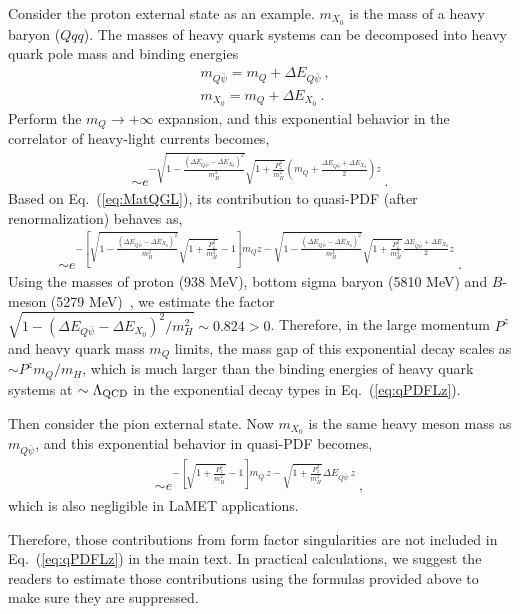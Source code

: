 \documentclass[a4paper,11pt]{article}
\begin{document}
Consider the proton external state as an example. $m_{X_0}$ is the mass of a heavy baryon ($Qqq$). The masses of heavy quark systems can be decomposed into heavy quark pole mass and binding energies
\begin{align}
&m_{Q \bar{\psi}} = m_{Q} + \Delta E_{Q\bar{\psi}} \ ,
\nonumber\\
&m_{X_0} = m_{Q} + \Delta E_{X_0} \ .
\end{align}
Perform the $m_{Q} \rightarrow +\infty$ expansion, and this exponential behavior in the correlator of heavy-light currents becomes,
\begin{align}
\sim e^{-\sqrt{1-\frac{\left(\Delta E_{Q
   \bar{\psi }}-\Delta E_{X_0}\right)^2}{m_H^2}}\sqrt{1+\frac{P_z^2}{m_H^2}} \left( m_{Q} + \frac{\Delta E_{Q\bar{\psi }}+\Delta E_{X_0}}{2}\right) z }  \ .
\end{align}
Based on Eq.~(\ref{eq:MatQGL}), its contribution to quasi-PDF (after renormalization) behaves as,
\begin{align}
\sim e^{-\left[\sqrt{1-\frac{\left(\Delta E_{Q
   \bar{\psi }}-\Delta E_{X_0}\right)^2}{m_H^2}}\sqrt{1+\frac{P_z^2}{m_H^2}}-1 \right] m_{Q} z -\sqrt{1-\frac{\left(\Delta E_{Q
   \bar{\psi }}-\Delta E_{X_0}\right)^2}{m_H^2}}\sqrt{1+\frac{P_z^2}{m_H^2}}  \frac{\Delta E_{Q\bar{\psi }}+\Delta E_{X_0}}{2} z} \ . 
\end{align}
Using the masses of proton (938 MeV), bottom sigma baryon (5810 MeV) and $B$-meson (5279 MeV)~\cite{ParticleDataGroup:2024cfk}, we estimate the factor $\sqrt{1-\left(\Delta E_{Q\bar{\psi }}-\Delta E_{X_0}\right)^2/m_H^2} \sim 0.824 > 0$. Therefore, in the large momentum $P^z$ and heavy quark mass $m_Q$ limits, the mass gap of this exponential decay scales as $\sim P^z m_{Q}/m_{H}$, which is much larger than the binding energies of heavy quark systems at $\sim\Lambda_{\rm QCD}$ in the exponential decay types in Eq.~(\ref{eq:qPDFLz}). 

Then consider the pion external state. Now $m_{X_0}$ is the same heavy meson mass as $m_{Q\bar{\psi}}$, and this exponential behavior in quasi-PDF becomes,
\begin{align}
\sim e^{-\left[\sqrt{1+\frac{P_z^2}{m_H^2}}-1 \right] m_{Q} \, z -\sqrt{1+\frac{P_z^2}{m_H^2}}  \Delta E_{Q\bar{\psi }} \, z} \ , 
\end{align}
which is also negligible in LaMET applications.  

Therefore, those contributions from form factor singularities are not included in Eq.~(\ref{eq:qPDFLz}) in the main text. In practical calculations, we suggest the readers to estimate those contributions using the formulas provided above to make sure they are suppressed. 
\fi
\end{document}
